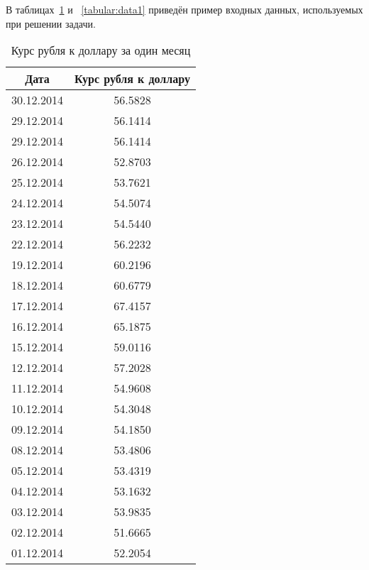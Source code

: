 \documentclass[12pt,a4paper,oneside]{extarticle}
\begin{document}
    В таблицах~\ref{tabular:data} и ~\ref{tabular:data1} приведён пример входных данных, используемых при решении задачи.
    \begin{table}[ht!]
        \caption{Курс рубля к доллару за один месяц}
        \centering
        \label{tabular:data}
        \small
        \begin{tabular}{|c|c|}
            \hline
            Дата  & Курс рубля к доллару \\ \hline
            30.12.2014 & 56.5828 \\ \hline
            29.12.2014 & 56.1414 \\ \hline
            29.12.2014 & 56.1414 \\ \hline
            26.12.2014 & 52.8703 \\ \hline
            25.12.2014 & 53.7621 \\ \hline
            24.12.2014 & 54.5074 \\ \hline
            23.12.2014 & 54.5440 \\ \hline
            22.12.2014 & 56.2232 \\ \hline
            19.12.2014 & 60.2196 \\ \hline
            18.12.2014 & 60.6779 \\ \hline
            17.12.2014 & 67.4157 \\ \hline
            16.12.2014 & 65.1875 \\ \hline
            15.12.2014 & 59.0116 \\ \hline
            12.12.2014 & 57.2028 \\ \hline
            11.12.2014 & 54.9608 \\ \hline
            10.12.2014 & 54.3048 \\ \hline
            09.12.2014 & 54.1850 \\ \hline
            08.12.2014 & 53.4806 \\ \hline
            05.12.2014 & 53.4319 \\ \hline
            04.12.2014 & 53.1632 \\ \hline
            03.12.2014 & 53.9835 \\ \hline
            02.12.2014 & 51.6665 \\ \hline
            01.12.2014 & 52.2054 \\ \hline
        \end{tabular}
    \end{table}
\end{document}
